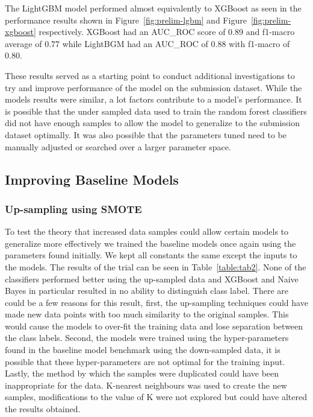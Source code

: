 \documentclass[journal,twoside,web]{ieeecolor}
\begin{document}
The LightGBM model performed almost equivalently to XGBoost as seen in the performance results shown in Figure~\ref{fig:prelim-lgbm} and Figure~\ref{fig:prelim-xgboost} respectively. XGBoost had an AUC\_ROC score of 0.89 and f1-macro average of 0.77 while LightBGM had an AUC\_ROC of 0.88 with f1-macro of 0.80.

These results served as a starting point to conduct additional investigations to try and improve performance of the model on the submission dataset. While the models results were similar, a lot factors contribute to a model's performance. It is possible that the under sampled data used to train the random forest classifiers did not have enough samples to allow the model to generalize to the submission dataset optimally. It was also possible that the parameters tuned need to be manually adjusted or searched over a larger parameter space.

\subsection{Improving Baseline Models}
\subsubsection{Up-sampling using SMOTE}
To test the theory that increased data samples could allow certain models to generalize more effectively we trained the baseline models once again using the parameters found initially. We kept all constants the same except the inputs to the models. The results of the trial can be seen in Table~\ref{table:tab2}. None of the classifiers performed better using the up-sampled data and XGBoost and Naive Bayes in particular resulted in no ability to distinguish class label. There are could be a few reasons for this result, first, the up-sampling techniques could have made new data points with too much similarity to the original samples. This would cause the models to over-fit the training data and lose separation between the class labels. Second, the models were trained using the hyper-parameters found in the baseline model benchmark using the down-sampled data, it is possible that these hyper-parameters are not optimal for the training input. Lastly, the method by which the samples were duplicated could have been inappropriate for the data. K-nearest neighbours was used to create the new samples, modifications to the value of K were not explored but could have altered the results obtained.
\end{document}
